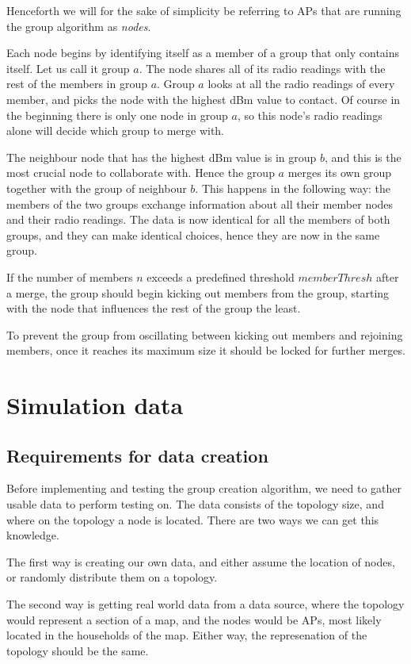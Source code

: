 \documentclass[a4paper,UKenglish]{report}
\begin{document}
Henceforth we will for the sake of simplicity be referring to APs that are running the group algorithm as \textit{nodes}.

Each node begins by identifying itself as a member of a group that only contains itself. Let us call it group $a$. The node shares all of
its radio readings with the rest of the members in group $a$. Group $a$ looks at all the radio readings of every member, and picks the node with the highest dBm value
to contact. Of course in the beginning there is only one node in group $a$, so this node's radio readings alone will decide which group to merge with. 

The neighbour node that has the highest dBm value is in group $b$, and this is the most crucial node to collaborate with. Hence the group $a$ merges its own group together
with the group of neighbour $b$. This happens in the following way: the members of the two groups exchange information about all their member nodes and their radio readings.
The data is now identical for all the members of both groups, and they can make identical choices, hence they are now in the same group. 

If the number of members $n$ exceeds a predefined threshold $memberThresh$ after a merge, the group should begin kicking out members from the group, starting with the node
that influences the rest of the group the least. 

To prevent the group from oscillating between kicking out members and rejoining members, once it reaches
its maximum size it should be locked for further merges. 

\section{Simulation data}

\subsection{Requirements for data creation}
Before implementing and testing the group creation algorithm, we need to gather usable data to perform testing on.
The data consists of the topology size, and where on the topology a node is located. There are two ways we can get this knowledge.

The first way is creating our own data, and either assume the location of nodes,
or randomly distribute them on a topology.

The second way is getting real world data from a data source, where the topology would represent a section of a map, and the nodes would be APs,
most likely located in the households of the map.
Either way, the represenation of the topology should be the same. 
\end{document}
